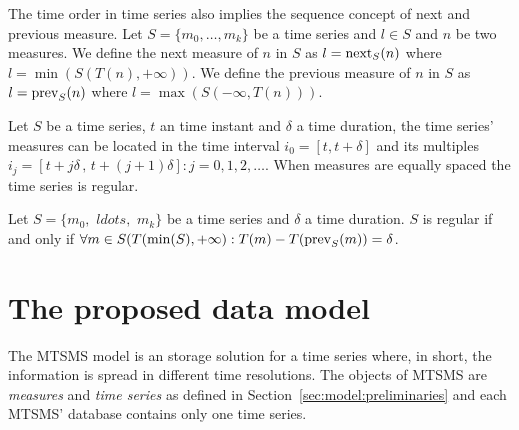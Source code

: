 The time order in time series also implies the sequence concept of
next and previous measure.  Let $S=\{m_0, \ldots, m_k\}$ be a time
series and $l\in S$ and $n$ be two measures. We define the next
measure of $n$ in $S$ as $l=\operatorname*{next}_S(n)$ where $l =
\min(S(T(n),+\infty))$. We define the previous measure of $n$ in $S$
as $l=\operatorname*{prev}_S(n)$ where $l = \max(S(-\infty,T(n)))$.



Let $S$ be a time series, $t$ an time instant and
$\delta$ a time duration, the time series' measures can be located in
the time interval $i_0=[t,t+\delta]$ and its multiples $i_j=[t+j\delta
\,,\, t+(j+1)\delta]: j=0,1,2,\ldots$. 
When  measures are
equally spaced the time series is regular.
\begin{definition}
  Let $S=\{m_0,$ $ldots,$ $m_k\}$ be a time series and $\delta$ a time
  duration. $S$ is regular if and only if $\forall m \in
  S(T(\min(S),+\infty):T(m) - T(\operatorname*{prev}_S(m)) =
  \delta$. %
\end{definition}



\section{The proposed data model}
\label{sec:MTSMS}


The MTSMS model is an storage solution for a time series
where, in short, the information is spread in different time
resolutions.  The objects of MTSMS are \emph{measures} and
\emph{time series} as defined in Section~\ref{sec:model:preliminaries} and
each MTSMS' database contains only one time series.


